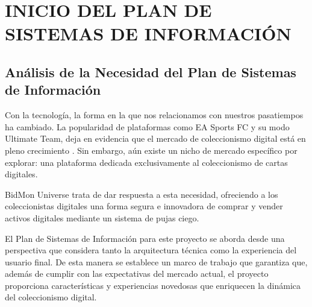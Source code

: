 
\section{INICIO DEL PLAN DE SISTEMAS DE INFORMACIÓN}
\subsection{Análisis de la Necesidad del Plan de Sistemas de Información}
Con la tecnología, la forma en la que nos relacionamos con nuestros pasatiempos ha cambiado. La popularidad de plataformas como EA Sports FC y su modo Ultimate Team\cite{artsEASPORTSFC2023}, 
deja en evidencia que el mercado de coleccionismo digital está en pleno crecimiento \cite{sanmartin000MillonesDolares2021}. 
Sin embargo, aún existe un nicho de mercado específico por explorar: una plataforma dedicada exclusivamente al coleccionismo de cartas digitales.

BidMon Universe trata de dar respuesta a esta necesidad, ofreciendo a los coleccionistas digitales una forma segura e innovadora de comprar y vender activos digitales mediante un sistema de pujas ciego.

El Plan de Sistemas de Información para este proyecto se aborda desde una perspectiva que considera tanto la arquitectura técnica como la experiencia del usuario final. 
De esta manera se establece un marco de trabajo que garantiza que, además de cumplir con las expectativas del mercado actual, el proyecto proporciona características y experiencias novedosas 
que enriquecen la dinámica del coleccionismo digital.

